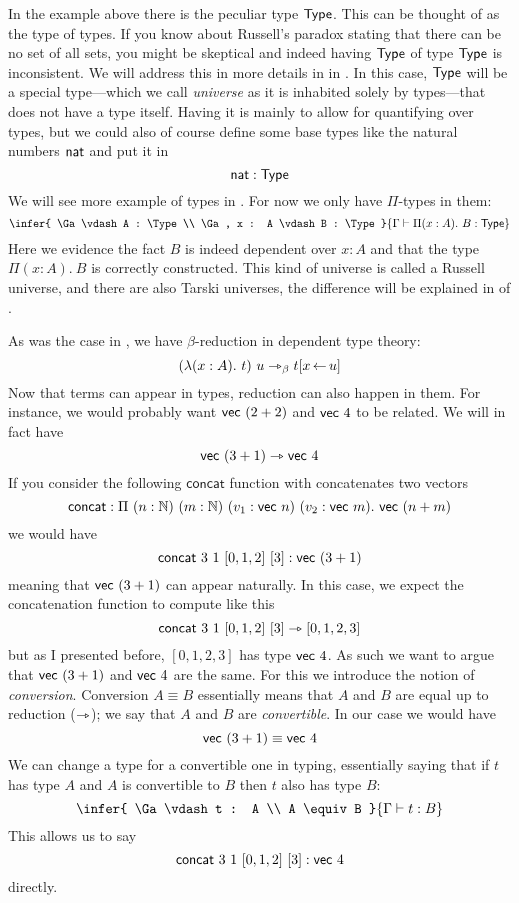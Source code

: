 
In the example above there is the peculiar type \(\mathsf{Type}\).
This can be thought of as the type of types. If you know about Russell's paradox
stating that there can be no set of all sets, you might be skeptical and indeed
having \(\mathsf{Type}\) of type \(\mathsf{Type}\) is inconsistent.
We will address this in more details in  in
.
In this case, \(\mathsf{Type}\) will be a special type---which we call \emph{universe}
as it is inhabited solely by types---that does not have a type itself.
Having it is mainly to allow for quantifying over types, but we could also of
course define some base types like the natural numbers \(\mathsf{nat}\) and put it in
\[
  \mathsf{nat} : \mathsf{Type}
\]
We will see more example of types in . For now we only have
\(\Pi\)-types in them:
\[
  \infer
    {
      \Ga \vdash A : \Type \\
      \Ga, x : A \vdash B : \Type
    }
    {\Ga \vdash \Pi (x:A).\ B : \Type}
\]
Here we evidence the fact \(B\) is indeed dependent over \(x : A\)
and that the type \(\Pi (x:A).\ B\) is correctly constructed.
This kind of universe is called a Russell universe, and there are also Tarski
universes, the difference will be explained in 
of .

As was the case in , we have \(\beta\)-reduction in
dependent type theory:
\[
  (\lambda (x:A).\ t)\ u \rightarrowtriangle_\beta t[x \mathop{\leftarrow} u]
\]
Now that terms can appear in types, reduction can also happen in them.
For instance, we would probably want \(\mathsf{vec}\ (2 + 2)\) and \(\mathsf{vec}\ 4\) to be
related. We will in fact have
\[
  \mathsf{vec}\ (3 + 1) \rightarrowtriangle \mathsf{vec}\ 4
\]
If you consider the following \(\mathsf{concat}\) function with concatenates
two vectors
\[
  \mathsf{concat} :
  \Pi\ (n : \mathbb{N})\ (m : \mathbb{N})\ (v_1 : \mathsf{vec}\ n)\ (v_2 : \mathsf{vec}\ m).\
  \mathsf{vec}\ (n + m)
\]
we would have
\[
  \mathsf{concat}\ 3\ 1\ [0,1,2]\ [3] : \mathsf{vec}\ (3 + 1)
\]
meaning that \(\mathsf{vec}\ (3 + 1)\) can appear naturally.
In this case, we expect the concatenation function to compute like this
\[
  \mathsf{concat}\ 3\ 1\ [0,1,2]\ [3] \rightarrowtriangle [0,1,2,3]
\]
but as I presented before, \([0,1,2,3]\) has type \(\mathsf{vec}\ 4\).
As such we want to argue that \(\mathsf{vec}\ (3 + 1)\) and \(\mathsf{vec}\ 4\) are the same.
For this we introduce the notion of \emph{conversion}.
Conversion \(A \equiv B\) essentially means that \(A\) and \(B\) are equal up
to reduction (\(\rightarrowtriangle\)); we say that \(A\) and \(B\) are \emph{convertible}.
In our case we would have
\[
  \mathsf{vec}\ (3 + 1) \equiv \mathsf{vec}\ 4
\]
We can change a type for a convertible one in typing, essentially saying that if
\(t\) has type \(A\) and \(A\) is convertible to \(B\) then \(t\) also has type
\(B\):
\[
  \infer
    {
      \Ga \vdash t : A \\
      A \equiv B
    }
    {\Ga \vdash t : B}
\]
This allows us to say
\[
  \mathsf{concat}\ 3\ 1\ [0,1,2]\ [3] : \mathsf{vec}\ 4
\]
directly.


